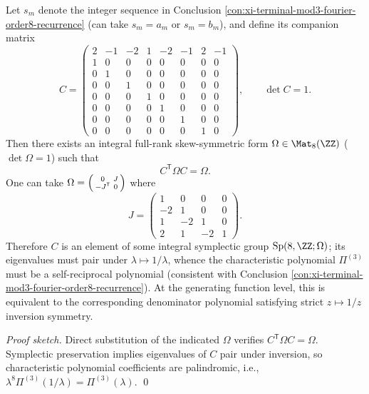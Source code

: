 \begin{conclusion}\label{con:xi-terminal-mod3-integral-symplectic}
Let \(s_m\) denote the integer sequence in Conclusion \ref{con:xi-terminal-mod3-fourier-order8-recurrence} (can take \(s_m=a_m\) or \(s_m=b_m\)), and define its companion matrix
\[
C=
\begin{pmatrix}
2&-1&-2&1&-2&-1&2&-1\\
1&0&0&0&0&0&0&0\\
0&1&0&0&0&0&0&0\\
0&0&1&0&0&0&0&0\\
0&0&0&1&0&0&0&0\\
0&0&0&0&1&0&0&0\\
0&0&0&0&0&1&0&0\\
0&0&0&0&0&0&1&0
\end{pmatrix},
\qquad \det C=1.
\]
Then there exists an integral full-rank skew-symmetric form \(\Omega\in \Mat_{8}(\ZZ)\) (\(\det\Omega=1\)) such that
\[
C^{\mathsf T}\Omega C=\Omega.
\]
One can take
\(
\Omega=\begin{psmallmatrix}0&J\\ -J^{\mathsf T}&0\end{psmallmatrix}
\)
where
\[
J=
\begin{pmatrix}
1&0&0&0\\
-2&1&0&0\\
1&-2&1&0\\
2&1&-2&1
\end{pmatrix}.
\]
Therefore \(C\) is an element of some integral symplectic group \(\mathrm{Sp}(8,\ZZ;\Omega)\); its eigenvalues must pair under \(\lambda\mapsto 1/\lambda\),
whence the characteristic polynomial \(\Pi^{(3)}\) must be a self-reciprocal polynomial (consistent with Conclusion \ref{con:xi-terminal-mod3-fourier-order8-recurrence}).
At the generating function level, this is equivalent to the corresponding denominator polynomial satisfying strict \(z\mapsto 1/z\) inversion symmetry.
\end{conclusion}
\begin{proof}[Proof sketch]
Direct substitution of the indicated \(\Omega\) verifies \(C^{\mathsf T}\Omega C=\Omega\).
Symplectic preservation implies eigenvalues of \(C\) pair under inversion, so characteristic polynomial coefficients are palindromic, i.e., \(\lambda^8\Pi^{(3)}(1/\lambda)=\Pi^{(3)}(\lambda)\). \qed
\end{proof}

